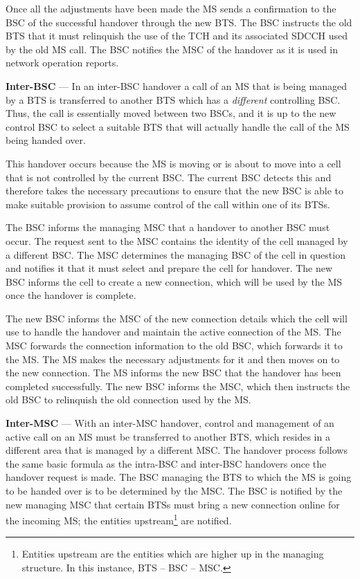 \begin{description}
Once all the adjustments have been made the MS sends a confirmation to the BSC of the successful handover through the new BTS\@. The BSC instructs the old BTS that it must relinquish the use of the TCH and its associated SDCCH used by the old MS call. The BSC notifies the MSC of the handover as it is used in network operation reports\cite{wirelesstelcoMullet,GSMArchitectureProtocolsServices}.
\item{\textbf{Inter-BSC}} --- In an inter-BSC handover a call of an MS that is being managed by a BTS is transferred to another BTS which has a \emph{different} controlling BSC\@. Thus, the call is essentially moved between two BSCs, and it is up to the new control BSC to select a suitable BTS that will actually handle the call of the MS being handed over\cite{wirelesstelcoMullet,GSMArchitectureProtocolsServices}.

This handover occurs because the MS is moving or is about to move into a cell that is not controlled by the current BSC\@. The current BSC detects this and therefore takes the necessary precautions to ensure that the new BSC is able to make suitable provision to assume control of the call within one of its BTSs\cite{wirelesstelcoMullet,GSMArchitectureProtocolsServices}.

The BSC informs the managing MSC that a handover to another BSC must occur. The request sent to the MSC contains the identity of the cell managed by a different BSC\@. The MSC determines the managing BSC of the cell in question and notifies it that it must select and prepare the cell for handover. The new BSC informs the cell to create a new connection, which will be used by the MS once the handover is complete\cite{wirelesstelcoMullet,GSMArchitectureProtocolsServices}.

The new BSC informs the MSC of the new connection details which the cell will use to handle the handover and maintain the active connection of the MS\@. The MSC forwards the connection information to the old BSC, which forwards it to the MS\@. The MS makes the necessary adjustments for it and then moves on to the new connection. The MS informs the new BSC that the handover has been completed successfully. The new BSC informs the MSC, which then instructs the old BSC to relinquish the old connection used by the MS\cite{wirelesstelcoMullet,GSMArchitectureProtocolsServices}.
\item{\textbf{Inter-MSC}} --- With an inter-MSC handover, control and management of an active call on an MS must be transferred to another BTS, which resides in a different area that is managed by a different MSC\@. The handover process follows the same basic formula as the intra-BSC and inter-BSC handovers once the handover request is made\cite{wirelesstelcoMullet,GSMArchitectureProtocolsServices}.
The BSC managing the BTS to which the MS is going to be handed over is to be determined by the MSC\@. The BSC is notified by the new managing MSC that certain BTSs must bring a new connection online for the incoming MS; the entities upstream\footnote{Entities upstream are the entities which are higher up in the managing structure. In this instance, BTS -- BSC -- MSC\@.} are notified\cite{wirelesstelcoMullet,GSMArchitectureProtocolsServices}.


\end{description}
